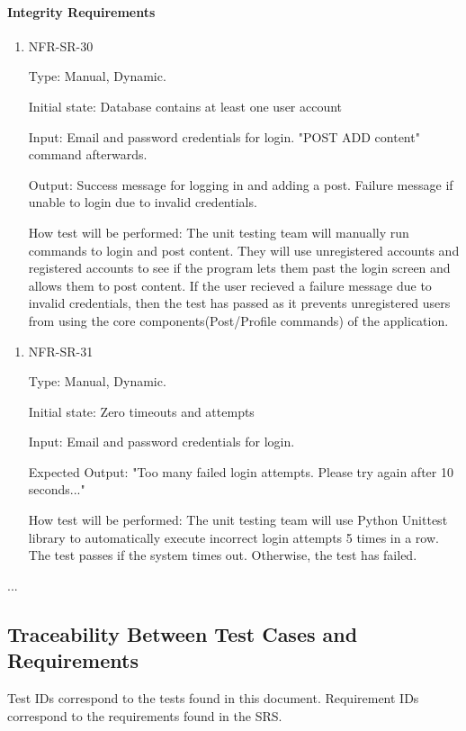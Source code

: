 \documentclass[12pt, titlepage]{article}
\begin{document}
 \paragraph{Integrity Requirements}
\begin{enumerate}
    \item{NFR-SR-30\\}
    
    Type: Manual, Dynamic.
    
    Initial state: Database contains at least one user account
    
    Input: Email and password credentials for login. "POST ADD content" command afterwards.
    
    Output: Success message for logging in and adding a post. Failure message if unable to login due to invalid credentials.
    
    How test will be performed: The unit testing team will manually run commands to login and post content. They will use unregistered accounts and registered accounts to see if the program lets them past the login screen and allows them to post content. If the user recieved a failure message due to invalid credentials, then the test has passed as it prevents unregistered users from using the core components(Post/Profile commands) of the application.
 \end{enumerate} 
 
 \begin{enumerate}
    \item{NFR-SR-31\\}
    
    Type: Manual, Dynamic.
    
    Initial state: Zero timeouts and attempts
    
    Input: Email and password credentials for login.
    
    Expected Output: "Too many failed login attempts. Please try again after 10 seconds..."
    
    How test will be performed: The unit testing team will use Python Unittest library to automatically execute incorrect login attempts 5 times in a row. The test passes if the system times out. Otherwise, the test has failed.
 \end{enumerate} 
 
...
\newpage
\subsection{Traceability Between Test Cases and Requirements}
\noindent Test IDs correspond to the tests found in this document. Requirement IDs correspond to the requirements found in the SRS. \\
\end{document}

